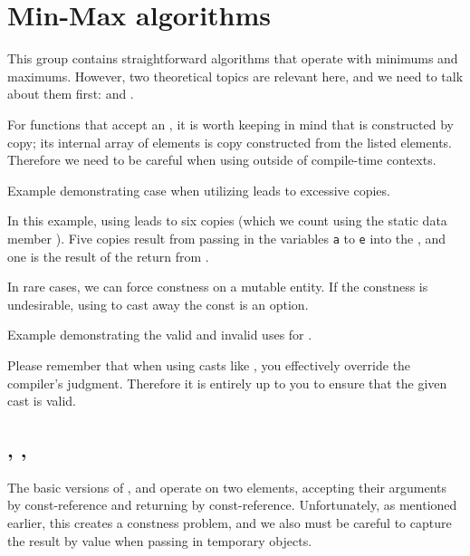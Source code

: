 \section{Min-Max algorithms}

This group contains straightforward algorithms that operate with minimums and maximums. However, two theoretical topics are relevant here, and we need to talk about them first:  and .

For functions that accept an , it is worth keeping in mind that  is constructed by copy; its internal array of elements is copy constructed from the listed elements. Therefore we need to be careful when using  outside of compile-time contexts.

\begin{box-note}
\footnotesize Example demonstrating case when utilizing  leads to excessive copies.
\tcblower
{}
\end{box-note}

In this example, using  leads to six copies (which we count using the static data member ). Five copies result from passing in the variables \texttt{a} to \texttt{e} into the , and one is the result of the return from .

In rare cases, we can force constness on a mutable entity. If the constness is undesirable, using  to cast away the const is an option.

\begin{box-note}
\footnotesize Example demonstrating the valid and invalid uses for .
\tcblower
{}
\end{box-note}

Please remember that when using casts like , you effectively override the compiler's judgment. Therefore it is entirely up to you to ensure that the given cast is valid.

\subsection{\texorpdfstring{, , }{\texttt{std::min}, \texttt{std::max}, \texttt{std::minmax}}}

The basic versions of ,  and  operate on two elements, accepting their arguments by const-reference and returning by const-reference. Unfortunately, as mentioned earlier, this creates a constness problem, and we also must be careful to capture the result by value when passing in temporary objects.

